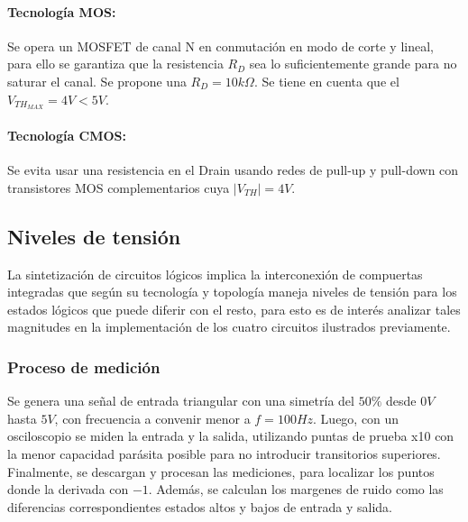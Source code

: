 \paragraph*{Tecnolog\'ia MOS:} Se opera un MOSFET de canal N en conmutaci\'on en modo de corte y lineal, para ello se garantiza que la resistencia $R_D$ sea lo suficientemente grande para no saturar el canal. Se propone una $R_D = 10k \Omega$. Se tiene en cuenta que el $V_{TH_{MAX}} = 4V < 5V$.
\paragraph*{Tecnolog\'ia CMOS:} Se evita usar una resistencia en el Drain usando redes de pull-up y pull-down con transistores MOS complementarios cuya $|V_{TH}| = 4V$.

\subsection{Niveles de tensi\'on}
La sintetizaci\'on de circuitos l\'ogicos implica la interconexi\'on de compuertas integradas que seg\'un su tecnolog\'ia y topolog\'ia maneja niveles de tensi\'on para los estados l\'ogicos que puede diferir con el resto, para esto
es de inter\'es analizar tales magnitudes en la implementaci\'on de los cuatro circuitos ilustrados previamente.

\subsubsection{Proceso de medici\'on}
Se genera una se\~nal de entrada triangular con una simetr\'ia del $50\%$ desde $0V$ hasta $5V$, con frecuencia a convenir menor a $f = 100Hz$. Luego, con un osciloscopio
se miden la entrada y la salida, utilizando puntas de prueba x10 con la menor capacidad par\'asita posible para no introducir transitorios superiores.
Finalmente, se descargan y procesan las mediciones, para localizar los puntos donde la derivada con $-1$. Adem\'as, se calculan los margenes de ruido como las 
diferencias correspondientes estados altos y bajos de entrada y salida.

